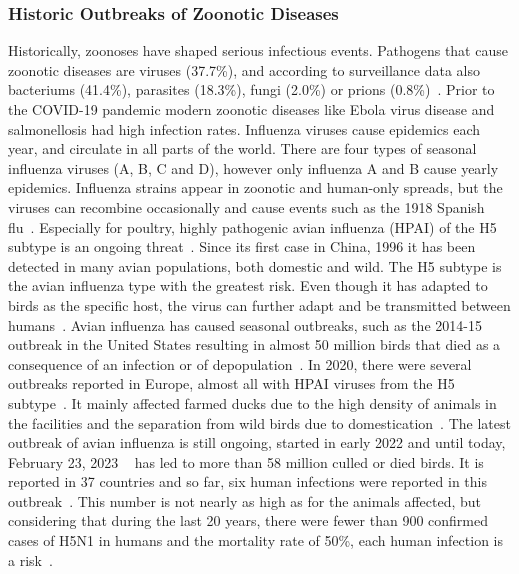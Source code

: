 \subsubsection*{Historic Outbreaks of Zoonotic Diseases}
Historically, zoonoses have shaped serious infectious events. Pathogens that cause zoonotic diseases are viruses (37.7\%), and according to surveillance data also bacteriums (41.4\%), parasites (18.3\%), fungi (2.0\%) or prions (0.8\%)~\cite{salyer2017prioritizing}. Prior to the COVID-19 pandemic modern zoonotic diseases like Ebola virus disease and salmonellosis had high infection rates. Influenza viruses cause epidemics each year, and circulate in all parts of the world. There are four types of seasonal influenza viruses (A, B, C and D), however only influenza A and B cause yearly epidemics. Influenza strains appear in zoonotic and human-only spreads, but the viruses can recombine occasionally and cause events such as the 1918 Spanish flu~\cite{garten2009antigenic, gibbs2001recombination}. Especially for poultry, highly pathogenic avian influenza (HPAI) of the H5 subtype is an ongoing threat~\cite{lee2017evolution}. Since its first case in China, 1996 it has been detected in many avian populations, both domestic and wild. The H5 subtype is the avian influenza type with the greatest risk. Even though it has adapted to birds as the specific host, the virus can further adapt and be transmitted between humans~\cite{webster1992evolution}. Avian influenza has caused seasonal outbreaks, such as the 2014-15 outbreak in the United States resulting in almost 50 million birds that died as a consequence of an infection or of depopulation~\cite{lee2016highly}. In 2020, there were several outbreaks reported in Europe, almost all with HPAI viruses from the H5 subtype~\cite{lewis2021emergence}. It mainly affected farmed ducks due to the high density of animals in the facilities and the separation from wild birds due to domestication~\cite{lewis2021emergence}. The latest outbreak of avian influenza is still ongoing, started in early 2022 and until today, February 23, 2023 ~ has led to more than 58 million culled or died birds. It is reported in 37 countries and so far, six human infections were reported in this outbreak~\cite{authority2023avian}. This number is not nearly as high as for the animals affected, but considering that during the last 20 years, there were fewer than 900 confirmed cases of H5N1 in humans and the mortality rate of 50\%, each human infection is a risk~\cite{authority2023avian}.

